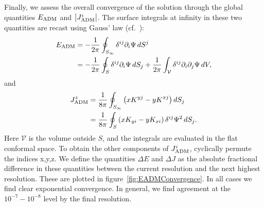 \documentclass[aps,prd,amsmath,floatfix
,twocolumn
,superscriptaddress,nofootinbib,showpacs]{revtex4-1}
\theoremstyle{plain} \newtheorem{thm}{Theorem} \newtheorem{lem}{Lemma}
\newcommand{\red}[1]{\textcolor{Red}{#1}}
\newcommand{\harald}[1]{{\textcolor{OliveGreen}{#1}}} %
\begin{document}
Finally, we assess the overall convergence of the solution through
the global quantities $E_{\rm ADM}$ and $\left|J^i_{\rm ADM}\right|$.  \harald{
The surface integrals at infinity in these two quantities are recast using Gauss' law (cf.~\cite{FoucartEtAl:2008}):
}
\begin{align}
E_{\rm ADM} &= -\frac{1}{2\pi}\oint_{S_{\infty}}\delta^{ij}\partial_i\Psi\, dS^j\nonumber \\
&= -\frac{1}{2\pi}\oint_{S}\delta^{ij}\partial_i\Psi\, dS_j  +\frac{1}{2\pi}\int_{\mathcal{V}}\delta^{ij}\partial_i\partial_j\Psi\,dV,
\end{align}
and
\begin{align}
J^{z}_{\rm ADM} 
& = \frac{1}{8\pi}\oint_{S_{\infty}}\left(xK^{yj}-y K^{xj}\right)dS_j\nonumber\\
& = \frac{1}{8\pi}\oint_{S}\left(xK_{yi}-yK_{xi}\right)\delta^{ij}\Psi^2\,dS_j.
\end{align}
\harald{Here $\mathcal V$ is the volume outside $S$, and the integrals are evaluated in the flat conformal space.  To obtain the other components of $J_{\rm ADM}^i$, cyclically permute the indices x,y,z.}
 We define the quantities $\Delta E$ and $\Delta J$ as the absolute fractional difference in these quantities between the current resolution and the next highest resolution. These are plotted in figure~\ref{fig:EADMConvergence}.  In all cases we find clear
exponential convergence. In general, we find
agreement at the $10^{-7}-10^{-8}$ level by the final
resolution.
\end{document}
